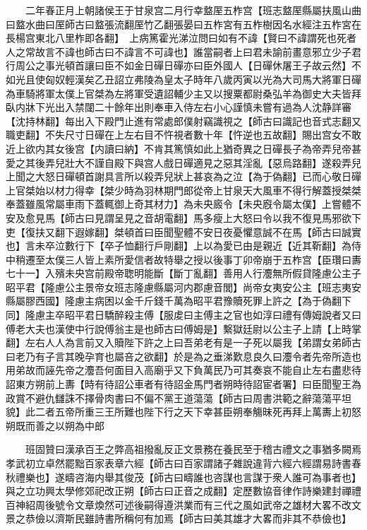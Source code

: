 　　二年春正月上朝諸侯王于甘泉宫二月行幸盩厔五柞宫【班志盩厔縣屬扶風山曲曰盩水曲曰厔師古曰盩張流翻厔竹乙翻張晏曰五柞宮有五柞樹因名水經注五柞宮在長楊宫東北八里柞即各翻】　上病篤霍光涕泣問曰如有不諱【賢曰不諱謂死也死者人之常故言不諱也師古曰不諱言不可諱也】誰當嗣者上曰君未諭前畫意邪立少子君行周公之事光頓首讓曰臣不如金日磾日磾亦曰臣外國人【日磾休屠王子故云然】不如光且使匈奴輕漢矣乙丑詔立弗陵為皇太子時年八歲丙寅以光為大司馬大將軍日磾為車騎將軍太僕上官桀為左將軍受遺詔輔少主又以搜粟都尉桑弘羊為御史大夫皆拜臥内牀下光出入禁闥二十餘年出則奉車入侍左右小心謹慎未嘗有過為人沈静詳審【沈持林翻】每出入下殿門止進有常處郎僕射竊識視之【師古曰識記也音式志翻又職吏翻】不失尺寸日磾在上左右目不忤視者數十年【忤逆也五故翻】賜出宫女不敢近上欲内其女後宫【内讀曰納】不肯其篤慎如此上猶奇異之日磾長子為帝弄兒帝甚愛之其後弄兒壯大不謹自殿下與宫人戲日磾適見之惡其淫亂【惡烏路翻】遂殺弄兒上聞之大怒日磾頓首謝具言所以殺弄兒狀上甚哀為之泣【為于偽翻】已而心敬日磾上官桀始以材力得幸【桀少時為羽林期門郎從帝上甘泉天大風車不得行解蓋授桀桀奉蓋雖風常屬車雨下蓋輒御上奇其材力】為未央廄令【未央廐令屬太僕】上嘗體不安及愈見馬【師古曰見謂呈見之音胡電翻】馬多瘦上大怒曰令以我不復見馬邪欲下吏【復扶又翻下遐嫁翻】桀頓首曰臣聞聖體不安日夜憂懼意誠不在馬【師古曰誠實也】言未卒泣數行下【卒子恤翻行戶剛翻】上以為愛已由是親近【近其靳翻】為侍中稍遷至太僕三人皆上素所愛信者故特舉之授以後事丁卯帝崩于五柞宫【臣瓚曰夀七十一】入殯未央宫前殿帝聦明能斷【斷丁亂翻】善用人行灋無所假貸隆慮公主子昭平君【隆慮公主景帝女班志隆慮縣屬河内郡慮音閭】尚帝女夷安公主【班志夷安縣屬膠西國】隆慮主病困以金千斤錢千萬為昭平君豫贖死罪上許之【為于偽翻下同】隆慮主卒昭平君日驕醉殺主傅【服䖍曰主傅主之官也如淳曰禮有傳姆說者又曰傅老大夫也漢使中行說傅翁主是也師古曰傅姆是】繫獄廷尉以公主子上請【上時掌翻】左右人人為言前又入贖陛下許之上曰吾弟老有是一子死以屬我【弟謂女弟師古曰老乃有子言其晚孕育也屬咅之欲翻】於是為之垂涕歎息良久曰灋令者先帝所造也用弟故而誣先帝之灋吾何面目入高廟乎又下負萬民乃可其奏哀不能自止左右盡悲待詔東方朔前上夀【時有待詔公車者有待詔金馬門者朔時待詔宦者署】曰臣聞聖王為政賞不避仇讎誅不擇骨肉書曰不偏不黨王道蕩蕩【師古曰周書洪範之辭蕩蕩平坦貌】此二者五帝所重三王所難也陛下行之天下幸甚臣朔奉觴昧死再拜上萬夀上初怒朔既而善之以朔為中郎

　　班固贊曰漢承百王之弊高祖撥亂反正文景務在養民至于稽古禮文之事猶多闕焉孝武初立卓然罷黜百家表章六經【師古曰百家謂諸子雜說違背六經六經謂易詩書春秋禮樂也】遂疇咨海内舉其俊茂【師古曰疇誰也咨謀也言謀于衆人誰可為事者也】與之立功興太學修郊祀改正朔【師古曰正音之成翻】定歷數協音律作詩樂建封禪禮百神紹周後號令文章煥然可述後嗣得遵洪業而有三代之風如武帝之雄材大畧不改文景之恭儉以濟斯民雖詩書所稱何有加焉【師古曰美其雄才大畧而非其不恭儉也】

